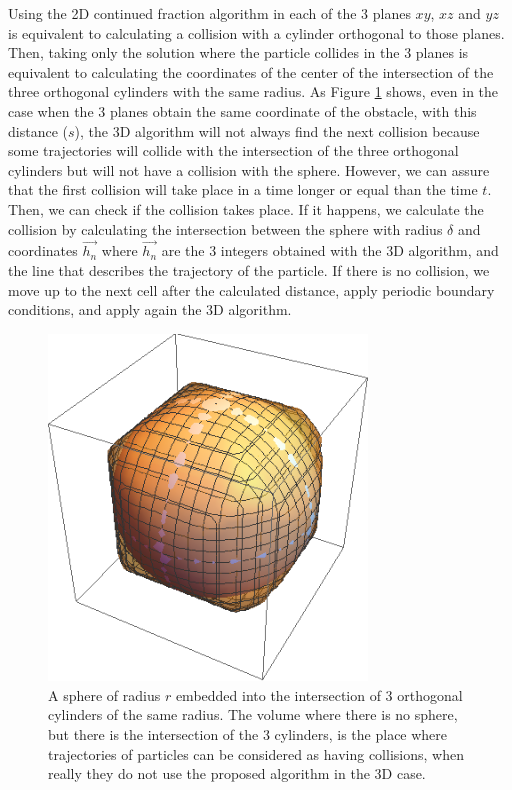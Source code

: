 \documentclass[prl,amsmath,amssymb, twocolumn, showpacs]{revtex4-1}
\begin{document}
Using the 2D continued fraction algorithm in each of the 3 planes $xy$, $xz$ and $yz$ is equivalent to calculating a collision with a cylinder orthogonal to those planes. Then, taking only the solution where the particle collides in the 3 planes is equivalent to calculating the coordinates of the center of the intersection of the three orthogonal cylinders with the same radius. 
As Figure \ref{fig:collision} shows, even in the case when the 3 planes obtain the same coordinate of the obstacle, with this distance ($s$), the 3D algorithm will not always find the next collision because some trajectories will collide with the intersection of the three orthogonal cylinders but will not have a collision with the sphere. However, we can assure that the first collision will take place in a time longer or equal than the time $t$. Then, we can check if the collision takes place. If it happens, we calculate the collision by calculating the intersection between the sphere with radius $\delta$ and coordinates $\vec{h_{n}}$ where $\vec{h_{n}}$ are the 3 integers obtained with the 3D algorithm, and the line that describes the trajectory of the particle. If there is no collision, we move up to the next cell after the calculated distance, apply periodic boundary conditions, and apply again the 3D algorithm. 
\begin{figure}
\centering
\includegraphics [width=240pt]{./region.png}
\caption{A sphere of radius $r$ embedded into the intersection of 3 orthogonal cylinders of the same radius. The volume where there is no sphere, but there is the intersection of the 3 cylinders, is the place where trajectories of particles can be considered as having collisions, when really they do not use the proposed algorithm in the 3D case.}
\label{fig:collision}
\end{figure}
\end{document}
